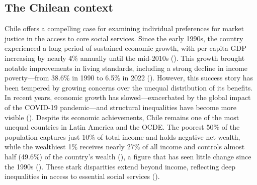 \documentclass[
  13pt,
]{article}
\begin{document}
\subsection{The Chilean context}\label{the-chilean-context}

Chile offers a compelling case for examining individual preferences for
market justice in the access to core social services. Since the early
1990s, the country experienced a long period of sustained economic
growth, with per capita GDP increasing by nearly 4\% annually until the
mid-2010s (). This growth brought notable improvements in living
standards, including a strong decline in income poverty---from 38.6\% in
1990 to 6.5\% in 2022 (). However, this success story has been tempered by growing
concerns over the unequal distribution of its benefits. In recent years,
economic growth has slowed---exacerbated by the global impact of the
COVID-19 pandemic---and structural inequalities have become more visible
(). Despite its
economic achievements, Chile remains one of the most unequal countries
in Latin America and the OCDE. The poorest 50\% of the population
captures just 10\% of total income and holds negative net wealth, while
the wealthiest 1\% receives nearly 27\% of all income and controls
almost half (49.6\%) of the country's wealth
(), a figure that
has seen little change since the 1990s
(). These stark
disparities extend beyond income, reflecting deep inequalities in access
to essential social services ().
\end{document}
